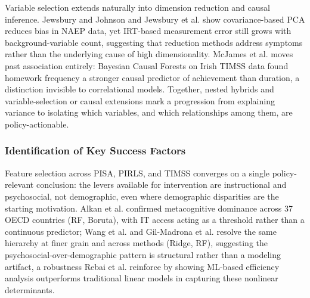 \documentclass{ieeeaccess}
\begin{document}
Variable selection extends naturally into dimension reduction and causal inference. Jewsbury and Johnson \cite{jewsbury-johnson2025} and Jewsbury et al. \cite{jewsbury-lockwood-johnson2025} show covariance-based PCA reduces bias in NAEP data, yet IRT-based measurement error still grows with background-variable count, suggesting that reduction methods address symptoms rather than the underlying cause of high dimensionality. McJames et al. \cite{mcjames-etal2024} moves past association entirely: Bayesian Causal Forests on Irish TIMSS data found homework frequency a stronger causal predictor of achievement than duration, a distinction invisible to correlational models. Together, nested hybrids and variable-selection or causal extensions mark a progression from explaining variance to isolating which variables, and which relationships among them, are policy-actionable.

\subsubsection{Identification of Key Success Factors}\label{subsubsec4.1.3}

Feature selection across PISA, PIRLS, and TIMSS converges on a single policy-relevant conclusion: the levers available for intervention are instructional and psychosocial, not demographic, even where demographic disparities are the starting motivation. Alkan et al. \cite{alkan-etal2025} confirmed metacognitive dominance across 37 OECD countries (RF, Boruta), with IT access acting as a threshold rather than a continuous predictor; Wang et al. \cite{wang-etal2022} and Gil-Madrona et al. \cite{gil-madrona-etal2025} resolve the same hierarchy at finer grain and across methods (Ridge, RF), suggesting the psychosocial-over-demographic pattern is structural rather than a modeling artifact, a robustness Rebai et al. \cite{rebai-etal2020} reinforce by showing ML-based efficiency analysis outperforms traditional linear models in capturing these nonlinear determinants.
\end{document}
